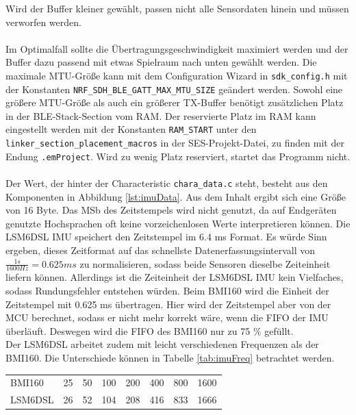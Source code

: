 Wird der Buffer kleiner gewählt, passen nicht alle Sensordaten hinein und müssen verworfen werden.\\\\
Im Optimalfall sollte die Übertragungsgeschwindigkeit maximiert werden und der Buffer dazu passend mit etwas Spielraum nach unten gewählt werden.
Die maximale MTU-Größe kann mit dem Configuration Wizard in \texttt{sdk\_config.h} mit der Konstanten \texttt{NRF\_SDH\_BLE\_GATT\_MAX\_MTU\_SIZE} geändert werden.
Sowohl eine größere MTU-Größe als auch ein größerer TX-Buffer benötigt zusätzlichen Platz in der BLE-Stack-Section vom RAM.
Der reservierte Platz im RAM kann eingestellt werden mit der Konstanten \texttt{RAM\_START} unter den \texttt{linker\_section\_placement\_macros} in der SES-Projekt-Datei, zu finden mit der Endung \texttt{.emProject}.
Wird zu wenig Platz reserviert, startet das Programm nicht.\\\\
Der Wert, der hinter der Characteristic \texttt{chara\_data.c} steht, besteht aus den Komponenten in Abbildung \ref{lst:imuData}.
Aus dem Inhalt ergibt sich eine Größe von 16 Byte.
Das MSb des Zeitstempels wird nicht genutzt, da auf Endgeräten genutzte Hochsprachen oft keine vorzeichenlosen Werte interpretieren können.
Die LSM6DSL IMU speichert den Zeitstempel im 6.4 ms Format.
Es würde Sinn ergeben, dieses Zeitformat auf das schnellste Datenerfassungsintervall von $\frac{1s}{1600Hz} = 0.625 ms$ zu normalisieren, sodass beide Sensoren dieselbe Zeiteinheit liefern können.
Allerdings ist die Zeiteinheit der LSM6DSL IMU kein Vielfaches, sodass Rundungsfehler entstehen würden.
Beim BMI160 wird die Einheit der Zeitstempel mit 0.625 ms übertragen.
Hier wird der Zeitstempel aber von der MCU berechnet, sodass er nicht mehr korrekt wäre, wenn die FIFO der IMU überläuft.
Deswegen wird die FIFO des BMI160 nur zu 75 \% gefüllt.\\
Der LSM6DSL arbeitet zudem mit leicht verschiedenen Frequenzen als der BMI160.
Die Unterschiede können in Tabelle \ref{tab:imuFreq} betrachtet werden. \cite {datasheet_lsm6dsl} \cite{datasheet_bmi160}\\
\begin{minipage}{\linewidth}
	\centering
	\label{tab:imuFreq}
	\begin{tabular}{l|l|l|l|l|l|l|l}
		BMI160 & 25 & 50 & 100 & 200 & 400 & 800 & 1600\\
		LSM6DSL & 26 & 52 & 104 & 208 & 416 & 833 & 1666\\
  \end{tabular}
\end{minipage}\\\\
